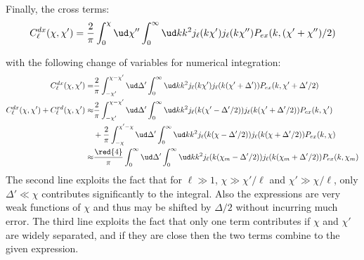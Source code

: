 \begin{widetext}
Finally, the cross terms:
\begin{equation}
C^{dx}_\ell(\chi,\chi')
    =
    \frac{2}{\pi}
    \int_0^\chi\ud\chi''
    \int_0^\infty\ud k k^2 
    j_\ell(k\chi') j_{\ell}(k\chi'')P_{ex}(k, (\chi' + \chi'')/2)
\end{equation}

with the following change of variables for numerical integration:
\begin{align}
C^{dx}_\ell(\chi,\chi')
    =&
    \frac{2}{\pi}
    \int_{-\chi'}^{\chi - \chi'}\ud\Delta'
    \int_0^\infty\ud k k^2 j_\ell(k\chi')
    j_{\ell}(k(\chi'+\Delta'))
    P_{ex}(k, \chi' + \Delta'/2)
    \\
C^{dx}_\ell(\chi,\chi') + C^{xd}_\ell(\chi,\chi')
    \approx&
    \frac{2}{\pi}
    \int_{-\chi'}^{\chi - \chi'}\ud\Delta'
    \int_0^\infty\ud k k^2 j_\ell(k(\chi'-\Delta'/2))
    j_{\ell}(k(\chi'+\Delta'/2))
    P_{ex}(k, \chi')
    \nonumber\\
    &+
    \frac{2}{\pi}
    \int_{-\chi}^{\chi' - \chi}\ud\Delta'
    \int_0^\infty\ud k k^2 j_\ell(k(\chi-\Delta'/2))
    j_{\ell}(k(\chi+\Delta'/2))
    P_{ex}(k, \chi)\\
    \approx&
    \frac{\red{4}}{\pi}
    \int_{0}^{\infty}\ud\Delta'
    \int_0^\infty\ud k k^2 j_\ell(k(\chi_m-\Delta'/2))
    j_{\ell}(k(\chi_m+\Delta'/2))
    P_{ex}(k, \chi_m)
\end{align}
The second line exploits the fact that for $\ell \gg 1$, $\chi \gg \chi'/\ell$ and
$\chi' \gg \chi/\ell$, only $\Delta'\ll\chi$ contributes significantly to the
integral. Also the expressions are very weak functions of $\chi$ and thus
may be shifted by $\Delta/2$ without incurring much error. The third line
exploits the fact that only one term contributes if $\chi$ and $\chi'$ are
widely separated, and if they are close then the two terms combine to the given
expression.



\end{widetext}

